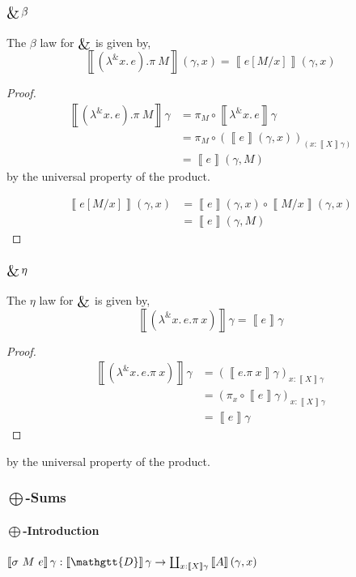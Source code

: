 \documentclass[acmsmall,nonacm]{acmart}
\renewcommand{\Delta}{\mathgtt{D}}
\newcommand{\sem}[1]{\left\llbracket{#1}\right\rrbracket}
\newcommand{\semg}[1]{\sem{#1}\gamma}
\DeclareMathOperator*{\bigamp}{\scalerel*{\&}{\bigoplus}}
\newcommand{\dlamb}[2]{{\lambda}^{{\&}} #1.\, #2}
\begin{document}
{\paragraph{$\bigamp\beta$}
The $\beta$ law for $\bigamp$ is given by,
\[
  \sem{(\dlamb x e).\pi~M}(\gamma, x) = \sem{e[M/x]}(\gamma, x)
\]
\begin{proof}
\begin{align*}
  \semg{(\dlamb x e).\pi~M}
  & = \pi_{M} \circ \semg{\dlamb x e} \\
  & = \pi_{M} \circ (\sem{e}(\gamma , x))_{(x : \semg{X})} \\
  & = \sem{e}(\gamma , M)
\end{align*}
by the universal property of the product.


\begin{align*}
  \sem{e[M/x]}(\gamma , x)
  & = \sem{e}(\gamma , x) \circ  \sem{M/x}(\gamma , x) \\
  & = \sem{e}(\gamma , M)
\end{align*}
\end{proof}

\paragraph{$\bigamp\eta$}
The $\eta$ law for $\bigamp$ is given by,
\[
  \semg{(\dlamb x {e.\pi~x})} = \semg{e}
\]
\begin{proof}
\begin{align*}
  \semg{(\dlamb x {e.\pi~x})}
  & = (\semg{e.\pi~x})_{x : \semg{X}} \\
  & = (\pi_x \circ \semg{e})_{x : \semg{X}} \\
  & = \semg{e}
\end{align*}
\end{proof}
by the universal property of the product.

\subsubsection{$\bigoplus$-Sums}
\paragraph{$\bigoplus$-Introduction}
$\semg{\sigma~M~e} : \semg{\Delta} \to \coprod_{x : \semg{X}} \sem{A}(\gamma, x)$

\begin{center}
\end{center}

}
\end{document}
